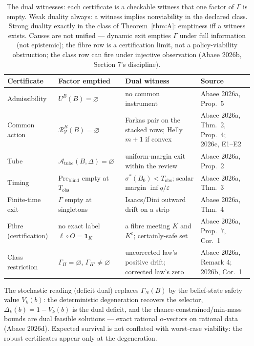 \documentclass[10pt,twocolumn]{article}
\theoremstyle{definition}
\begin{document}
\begin{table}[t]
\centering\small
\footnotesize
\begin{tabular}{@{}p{}p{}p{}p{}@{}}
\toprule
Certificate & Factor emptied & Dual witness & Source\\
\midrule
Admissibility & $U^B(B) = \varnothing$ & no common instrument & Abaee 2026a, Prop.\ 5\\
Common action & $\mathcal{R}^B_{\mathcal{V}}(B) = \varnothing$ & Farkas pair on the stacked rows; Helly $m{+}1$ if convex & Abaee 2026a, Thm.\ 2, Prop.\ 4; 2026c, E1--E2\\
Tube & $\mathcal{A}_{\mathrm{tube}}(B,\Delta) = \varnothing$ & uniform-margin exit within the review & Abaee 2026a, Prop.\ 2\\
Timing & $\mathrm{Pre}_{\mathrm{blind}}$ empty at $T_{\mathrm{obs}}$ & $\sigma^{*}(B_0) < T_{\mathrm{obs}}$; scalar margin $\inf q/\varepsilon$ & Abaee 2026a, Thm.\ 3\\
Finite-time exit & $\Gamma$ empty at singletons & Isaacs/Dini outward drift on a strip & Abaee 2026a, Thm.\ 4\\
Fibre (certification) & no exact label $\ell \circ O = \mathbf{1}_K$ & a fibre meeting $K$ and $K^c$; certainly-safe set & Abaee 2026a, Prop.\ 7, Cor.\ 1\\
Class restriction & $\Gamma_{\Pi} = \varnothing$, $\Gamma_{\Pi'} \neq \varnothing$ & uncorrected law's positive drift; corrected law's zero & Abaee 2026a, Remark 4; 2026b, Cor.\ 1\\
\bottomrule
\end{tabular}
\caption{The dual witnesses: each certificate is a checkable witness that one factor of $\Gamma$ is empty. Weak duality always: a witness implies nonviability in the declared class. Strong duality exactly in the class of Theorem~\ref{thm:A}: emptiness iff a witness exists. Causes are not unified --- dynamic exit empties $\Gamma$ under full information (not epistemic); the fibre row is a certification limit, not a policy-viability obstruction; the class row can fire under injective observation (Abaee 2026b, Section 7's discipline).}
\end{table}

The stochastic reading (deficit dual) replaces $\Gamma_N(B)$ by the
belief-state safety value $V_k(b)$: the deterministic degeneration recovers
the selector, $\Delta_k(b) = 1 - V_k(b)$ is the dual deficit, and the
chance-constrained/min-mass bounds are dual feasible solutions --- exact
rational $\alpha$-vectors on rational data (Abaee 2026d). Expected
survival is not conflated with worst-case viability: the robust
certificates appear only at the degeneration.
\end{document}
